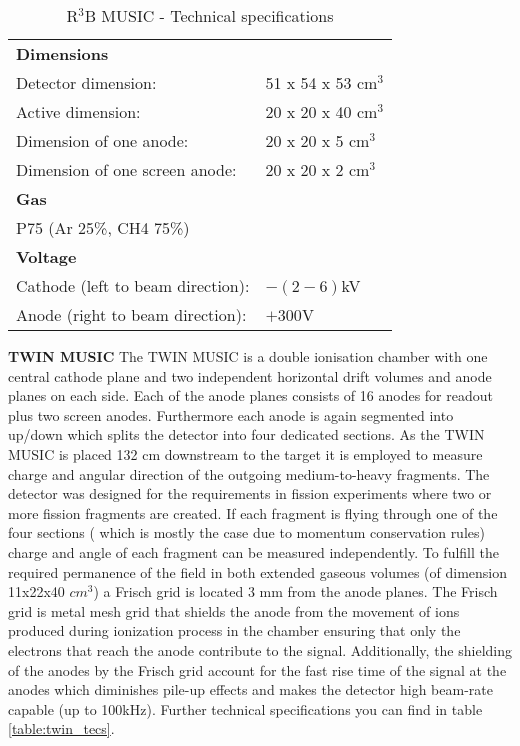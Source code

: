 \begin{table}[h!]
    \centering
    \begin{tabular}{ll}
        \hline
        \textbf{Dimensions} & \\ 
	Detector dimension: & 51 x 54 x 53 cm$^3$ \\ 
	Active dimension: & 20 x 20 x 40 cm$^3$\\
	Dimension of one anode:& 20 x 20 x 5 cm$^3$\\
	Dimension of one screen anode:& 20 x 20 x 2 cm$^3$\\
	\textbf{Gas} &\\
	P75 (Ar 25\%, CH4 75\%) \\
	\textbf{Voltage} & \\
	Cathode (left to beam direction): &  $-(2-6)$kV \\
	Anode (right to beam direction): & $+300$V \\
	\hline
    \end{tabular}
    \caption{R$^3$B MUSIC - Technical specifications}
	\label{table:r3bmusic_tecs}
\end{table}
\newline
\textbf{TWIN MUSIC}\newline
The TWIN MUSIC is a double ionisation chamber with one central cathode plane and two independent horizontal drift volumes and anode planes on each side. Each of the anode planes consists of 16 anodes for readout plus two screen anodes. Furthermore each anode is again segmented into up/down which splits the detector into four dedicated sections. As the TWIN MUSIC is placed 132 cm downstream to the target it is employed to measure charge and angular direction of the outgoing medium-to-heavy fragments. The detector was designed for the requirements in fission experiments where two or more fission fragments are created. If each fragment is flying through one of the four sections ( which is mostly the case due to momentum conservation rules) charge and angle of each fragment can be measured independently.\newline
To fulfill the required permanence of the field in both extended gaseous volumes (of dimension 11x22x40 $cm^3$) a Frisch grid is located 3 mm from the anode planes. The Frisch grid is metal mesh grid that shields the anode from the movement of ions produced during ionization process in the chamber ensuring that only the electrons that reach the anode contribute to the signal. Additionally, the shielding of the anodes by the Frisch grid account for the fast rise time of the signal at the anodes which diminishes pile-up effects and makes the detector high beam-rate capable (up to 100kHz). Further technical specifications you can find in table \ref{table:twin_tecs}.
